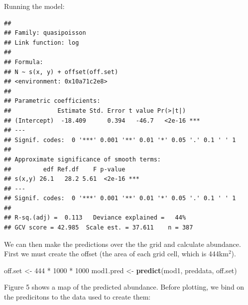\documentclass[]{amsart}
\newenvironment{Shaded}{}{}
\newcommand{\KeywordTok}[1]{\textcolor[rgb]{0.00,0.44,0.13}{\textbf{{#1}}}}
\newcommand{\DecValTok}[1]{\textcolor[rgb]{0.25,0.63,0.44}{{#1}}}
\newcommand{\StringTok}[1]{\textcolor[rgb]{0.25,0.44,0.63}{{#1}}}
\newcommand{\NormalTok}[1]{{#1}}
\begin{document}
Running the model:

\begin{Shaded}
\end{Shaded}

\begin{verbatim}
## 
## Family: quasipoisson 
## Link function: log 
## 
## Formula:
## N ~ s(x, y) + offset(off.set)
## <environment: 0x10a71c2e8>
## 
## Parametric coefficients:
##             Estimate Std. Error t value Pr(>|t|)    
## (Intercept)  -18.409      0.394   -46.7   <2e-16 ***
## ---
## Signif. codes:  0 '***' 0.001 '**' 0.01 '*' 0.05 '.' 0.1 ' ' 1
## 
## Approximate significance of smooth terms:
##         edf Ref.df    F p-value    
## s(x,y) 26.1   28.2 5.61  <2e-16 ***
## ---
## Signif. codes:  0 '***' 0.001 '**' 0.01 '*' 0.05 '.' 0.1 ' ' 1
## 
## R-sq.(adj) =  0.113   Deviance explained =   44%
## GCV score = 42.985  Scale est. = 37.611    n = 387
\end{verbatim}

We can then make the predictions over the the grid and calculate
abundance. First we must create the offset (the area of each grid cell,
which is 444km$^2$).

\begin{Shaded}
\begin{Highlighting}[]
\NormalTok{off.set <-}\StringTok{ }\DecValTok{444} \NormalTok{*}\StringTok{ }\DecValTok{1000} \NormalTok{*}\StringTok{ }\DecValTok{1000}
\NormalTok{mod1.pred <-}\StringTok{ }\KeywordTok{predict}\NormalTok{(mod1, preddata, off.set)}
\end{Highlighting}
\end{Shaded}

Figure 5 shows a map of the predicted abundance. Before plotting, we
bind on the predicitons to the data used to create them:
\end{document}
